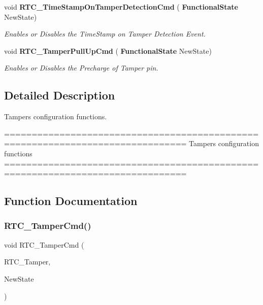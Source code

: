 \begin{DoxyCompactItemize}
void \textbf{ R\+T\+C\+\_\+\+Time\+Stamp\+On\+Tamper\+Detection\+Cmd} (\textbf{ Functional\+State} New\+State)
\begin{DoxyCompactList}\small\item\em Enables or Disables the Time\+Stamp on Tamper Detection Event. \end{DoxyCompactList}\item 
void \textbf{ R\+T\+C\+\_\+\+Tamper\+Pull\+Up\+Cmd} (\textbf{ Functional\+State} New\+State)
\begin{DoxyCompactList}\small\item\em Enables or Disables the Precharge of Tamper pin. \end{DoxyCompactList}\end{DoxyCompactItemize}


\subsection{Detailed Description}
Tampers configuration functions. 

\begin{DoxyVerb} ===============================================================================
                       Tampers configuration functions
 ===============================================================================  \end{DoxyVerb}
 

\subsection{Function Documentation}
\mbox{\label{group__RTC__Group9_gaf85cc696d624da0de9fbe99779402833}} 
\subsubsection{R\+T\+C\+\_\+\+Tamper\+Cmd()}
{\footnotesize\ttfamily void R\+T\+C\+\_\+\+Tamper\+Cmd (\begin{DoxyParamCaption}\item[{uint32\+\_\+t}]{R\+T\+C\+\_\+\+Tamper,  }\item[{\textbf{ Functional\+State}}]{New\+State }\end{DoxyParamCaption})}



